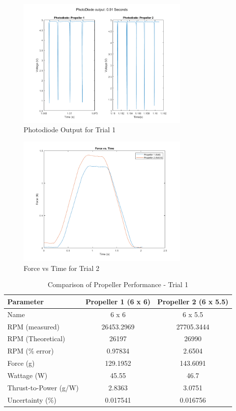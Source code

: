 \documentclass{article}
\begin{document}
\begin{figure}[H]
  \centering
  \includegraphics[width = 0.75\textwidth]{finalprojectimages/Trial1_PhotoDiode.png}
  \caption{Photodiode Output for Trial 1}
  \label{fig:photodiode}
\end{figure}

\begin{figure}[H]
  \centering
  \includegraphics[width = 0.75\textwidth]{finalprojectimages/Trial2_ForcevTime.png}
  \caption{Force vs Time for Trial 2}
  \label{fig:forcevtime2}
\end{figure}

\begin{table}[H]
  \centering
  \begin{tabular}{lcc}
  \hline
  \textbf{Parameter} & \textbf{Propeller 1 (6 x 6)} & \textbf{Propeller 2 (6 x 5.5)} \\
  \hline
  Name & 6 x 6 & 6 x 5.5 \\
  RPM (measured) & 26453.2969 & 27705.3444 \\
  RPM (Theoretical) & 26197 & 26990 \\
  RPM (\% error) & 0.97834 & 2.6504 \\
  Force (g) & 129.1952 & 143.6091 \\
  Wattage (W) & 45.55 & 46.7 \\
  Thrust-to-Power (g/W) & 2.8363 & 3.0751 \\
  Uncertainty (\%) & 0.017541 & 0.016756 \\
  \hline
  \end{tabular}
  \caption{Comparison of Propeller Performance - Trial 1}
  \label{table:propeller_comparison1}
  \end{table}
\end{document}

